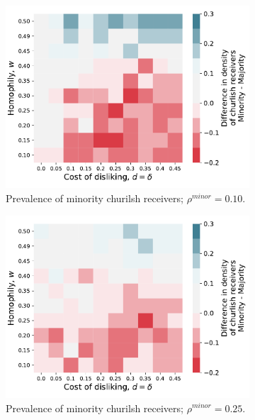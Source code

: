 \documentclass[11pt,letterpaper]{article}
\begin{document}
\begin{figure}[H]
  \begin{subfigure}{0.4\textwidth}
    \centering
    \includegraphics[width=\textwidth]{prelim/Figures/churlish_receivers_diff_010.pdf}
    \caption{Prevalence of minority churilsh receivers; $\rho^{minor} = 0.10$.}
  \end{subfigure}
  \hfill
  \begin{subfigure}{0.4\textwidth}
    \centering
    \includegraphics[width=\textwidth]{prelim/Figures/churlish_receivers_diff_025.pdf}
    \caption{Prevalence of minority churilsh receivers; $\rho^{minor} = 0.25$.}
  \end{subfigure}
  \caption{}
\end{figure}
\end{document}

